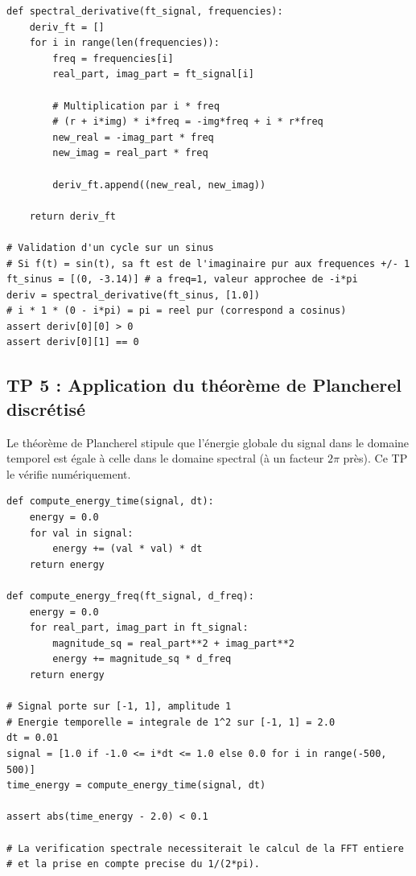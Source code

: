 \documentclass[11pt,a4paper]{article}
\begin{document}
\begin{lstlisting}
def spectral_derivative(ft_signal, frequencies):
    deriv_ft = []
    for i in range(len(frequencies)):
        freq = frequencies[i]
        real_part, imag_part = ft_signal[i]

        # Multiplication par i * freq
        # (r + i*img) * i*freq = -img*freq + i * r*freq
        new_real = -imag_part * freq
        new_imag = real_part * freq

        deriv_ft.append((new_real, new_imag))

    return deriv_ft

# Validation d'un cycle sur un sinus
# Si f(t) = sin(t), sa ft est de l'imaginaire pur aux frequences +/- 1
ft_sinus = [(0, -3.14)] # a freq=1, valeur approchee de -i*pi
deriv = spectral_derivative(ft_sinus, [1.0])
# i * 1 * (0 - i*pi) = pi = reel pur (correspond a cosinus)
assert deriv[0][0] > 0
assert deriv[0][1] == 0
\end{lstlisting}


\subsection*{TP 5 : Application du théorème de Plancherel discrétisé}

Le théorème de Plancherel stipule que l'énergie globale du signal dans le domaine temporel est égale à celle dans le domaine spectral (à un facteur $2\pi$ près). Ce TP le vérifie numériquement.

\begin{lstlisting}
def compute_energy_time(signal, dt):
    energy = 0.0
    for val in signal:
        energy += (val * val) * dt
    return energy

def compute_energy_freq(ft_signal, d_freq):
    energy = 0.0
    for real_part, imag_part in ft_signal:
        magnitude_sq = real_part**2 + imag_part**2
        energy += magnitude_sq * d_freq
    return energy

# Signal porte sur [-1, 1], amplitude 1
# Energie temporelle = integrale de 1^2 sur [-1, 1] = 2.0
dt = 0.01
signal = [1.0 if -1.0 <= i*dt <= 1.0 else 0.0 for i in range(-500, 500)]
time_energy = compute_energy_time(signal, dt)

assert abs(time_energy - 2.0) < 0.1

# La verification spectrale necessiterait le calcul de la FFT entiere
# et la prise en compte precise du 1/(2*pi).
\end{lstlisting}
\end{document}
